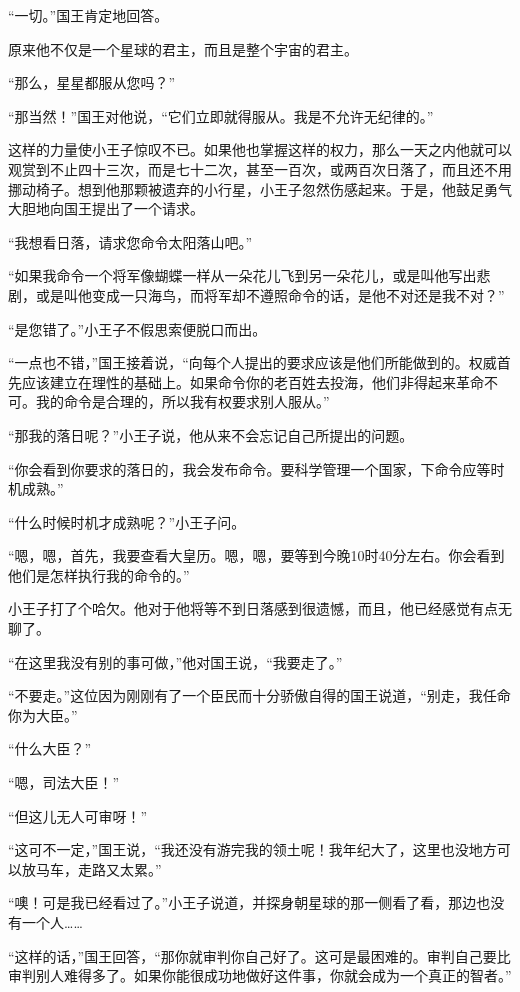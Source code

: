 “一切。”国王肯定地回答。

原来他不仅是一个星球的君主，而且是整个宇宙的君主。

“那么，星星都服从您吗？”

“那当然！”国王对他说，“它们立即就得服从。我是不允许无纪律的。”

这样的力量使小王子惊叹不已。如果他也掌握这样的权力，那么一天之内他就可以观赏到不止四十三次，而是七十二次，甚至一百次，或两百次日落了，而且还不用挪动椅子。想到他那颗被遗弃的小行星，小王子忽然伤感起来。于是，他鼓足勇气大胆地向国王提出了一个请求。

“我想看日落，请求您命令太阳落山吧。”

“如果我命令一个将军像蝴蝶一样从一朵花儿飞到另一朵花儿，或是叫他写出悲剧，或是叫他变成一只海鸟，而将军却不遵照命令的话，是他不对还是我不对？”

“是您错了。”小王子不假思索便脱口而出。

“一点也不错，”国王接着说，“向每个人提出的要求应该是他们所能做到的。权威首先应该建立在理性的基础上。如果命令你的老百姓去投海，他们非得起来革命不可。我的命令是合理的，所以我有权要求别人服从。”

“那我的落日呢？”小王子说，他从来不会忘记自己所提出的问题。

“你会看到你要求的落日的，我会发布命令。要科学管理一个国家，下命令应等时机成熟。”

“什么时候时机才成熟呢？”小王子问。

“嗯，嗯，首先，我要查看大皇历。嗯，嗯，要等到今晚10时40分左右。你会看到他们是怎样执行我的命令的。”

小王子打了个哈欠。他对于他将等不到日落感到很遗憾，而且，他已经感觉有点无聊了。

“在这里我没有别的事可做，”他对国王说，“我要走了。”

“不要走。”这位因为刚刚有了一个臣民而十分骄傲自得的国王说道，“别走，我任命你为大臣。”

“什么大臣？”

“嗯，司法大臣！”

“但这儿无人可审呀！”

“这可不一定，”国王说，“我还没有游完我的领土呢！我年纪大了，这里也没地方可以放马车，走路又太累。”

“噢！可是我已经看过了。”小王子说道，并探身朝星球的那一侧看了看，那边也没有一个人\ldots{}\ldots{}

“这样的话，”国王回答，“那你就审判你自己好了。这可是最困难的。审判自己要比审判别人难得多了。如果你能很成功地做好这件事，你就会成为一个真正的智者。”

